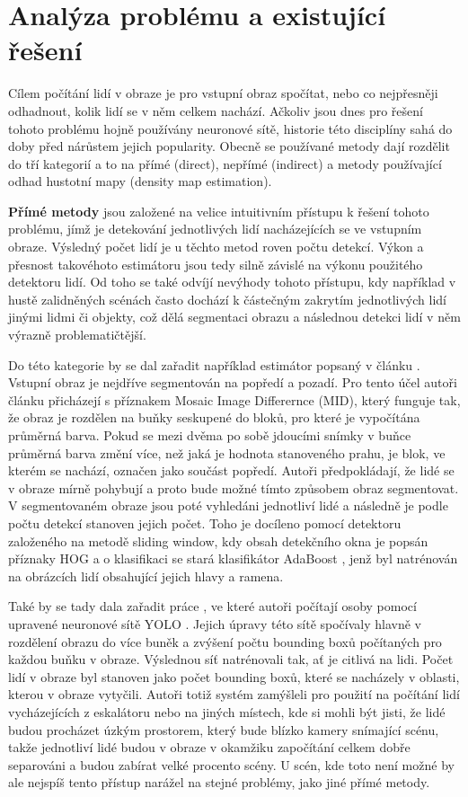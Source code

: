 \chapter{Analýza problému a existující řešení}
\label{sec:History}

Cílem počítání lidí v obraze je pro vstupní obraz spočítat, nebo co nejpřesněji odhadnout, kolik lidí se v něm celkem nachází.
Ačkoliv jsou dnes pro řešení tohoto problému hojně používány neuronové sítě, historie této disciplíny sahá do doby před nárůstem jejich popularity.
Obecně se používané metody dají rozdělit do tří kategorií a to na přímé (direct), nepřímé (indirect) a metody používající odhad hustotní mapy (density map estimation).

\textbf{Přímé metody} jsou založené na velice intuitivním přístupu k řešení tohoto problému, jímž je detekování jednotlivých lidí nacházejících se ve vstupním obraze. Výsledný počet lidí je u těchto metod roven počtu detekcí. Výkon a přesnost takovéhoto estimátoru jsou tedy silně závislé na výkonu použitého detektoru lidí.
Od toho se také odvíjí nevýhody tohoto přístupu, kdy například v hustě zalidněných scénách často dochází k částečným zakrytím jednotlivých lidí jinými lidmi či objekty, což dělá segmentaci obrazu a následnou detekci lidí v něm výrazně problematičtější.

Do této kategorie by se dal zařadit například estimátor popsaný v článku \cite{head_and_shoulders}.
Vstupní obraz je nejdříve segmentován na popředí a pozadí.
Pro tento účel autoři článku přicházejí s příznakem Mosaic Image Differernce (MID), který funguje tak, že obraz je rozdělen na buňky seskupené do bloků, pro které je vypočítána průměrná barva. Pokud se mezi dvěma po sobě jdoucími snímky v buňce průměrná barva změní více, než jaká je hodnota stanoveného prahu, je blok, ve kterém se nachází, označen jako součást popředí.
Autoři předpokládají, že lidé se v obraze mírně pohybují a proto bude možné tímto způsobem obraz segmentovat.
V segmentovaném obraze jsou poté vyhledáni jednotliví lidé a následně je podle počtu detekcí stanoven jejich počet.
Toho je docíleno pomocí detektoru založeného na metodě sliding window, kdy obsah detekčního okna je popsán příznaky HOG \cite{HOG} a o klasifikaci se stará klasifikátor AdaBoost \cite{AdaBoost}, jenž byl natrénován na obrázcích lidí obsahující jejich hlavy a ramena.

Také by se tady dala zařadit práce \cite{YOLO_counting}, ve které autoři počítají osoby pomocí upravené neuronové sítě YOLO \cite{YOLO}.
Jejich úpravy této sítě spočívaly hlavně v rozdělení obrazu do více buněk a zvýšení počtu bounding boxů počítaných pro každou buňku v obraze. Výslednou síť natrénovali tak, ať je citlivá na lidi.
Počet lidí v obraze byl stanoven jako počet bounding boxů, které se nacházely v oblasti, kterou v obraze vytyčili.
Autoři totiž systém zamýšleli pro použití na počítání lidí vycházejících z eskalátoru nebo na jiných místech, kde si mohli být jisti, že lidé budou procházet úzkým prostorem, který bude blízko kamery snímající scénu, takže jednotliví lidé budou v obraze v okamžiku započítání celkem dobře separováni a budou zabírat velké procento scény.
U scén, kde toto není možné by ale nejspíš tento přístup narážel na stejné problémy, jako jiné přímé metody.



